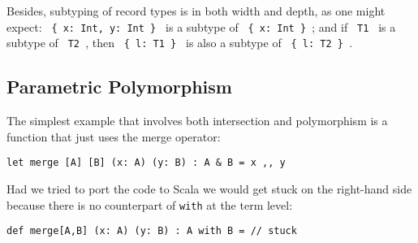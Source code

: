 {Besides, subtyping of record types is in both width and depth, as one might
expect: \lstinline$ { x: Int, y: Int } $ is a subtype of
\lstinline$ { x: Int } $; and if \lstinline$ T1 $ is a subtype of
\lstinline$ T2 $, then \lstinline$ { l: T1 } $ is also a subtype of
\lstinline$ { l: T2 } $.





\subsection{Parametric Polymorphism}


The simplest example that involves both intersection and polymorphism is a
function that just uses the merge operator:
\begin{lstlisting}
let merge [A] [B] (x: A) (y: B) : A & B = x ,, y
\end{lstlisting}
Had we tried to port the code to Scala we would get stuck on the right-hand side
because there is no counterpart of \lstinline{with} at the term level:
\begin{lstlisting}
def merge[A,B] (x: A) (y: B) : A with B = // stuck
\end{lstlisting}

}
